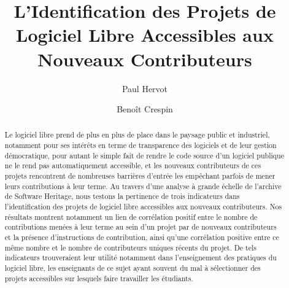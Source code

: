 \documentclass[dvipsnames]{llncs}
\title{L'Identification des Projets de Logiciel Libre Accessibles aux Nouveaux Contributeurs}
\author{%
    \todo[inline]{TODO: anonymiser les auteurs pour la soumission initiale}
    Paul Hervot\inst{1}%
    \and%
    Benoît Crespin\inst{2}\orcidID{0000-0002-9105-0243}%
}
\institute{EPITA}
\institute{EPITA \and Université de Limoge}
\begin{document}
    \maketitle

    \begin{abstract}
        Le logiciel libre prend de plus en plus de place dans le paysage public et industriel, notamment pour
        ses intérêts en terme de transparence des logiciels et de leur gestion démocratique, pour autant le
        simple fait de rendre le code source d'un logiciel publique ne le rend pas automatiquement accessible,
        et les nouveaux contributeurs de ces projets rencontrent de nombreuses barrières d'entrée les
        empêchant parfois de mener leurs contributions à leur terme. Au travers d'une analyse à grande échelle
        de l'archive de Software Heritage, nous testons la pertinence de trois indicateurs dans
        l'identification des projets de logiciel libre accessibles aux nouveaux contributeurs. Nos résultats
        montrent notamment un lien de corrélation positif entre le nombre de contributions menées à leur terme
        au sein d'un projet par de nouveaux contributeurs et la présence d'instructions de contribution, ainsi
        qu'une corrélation positive entre ce même nombre et le nombre de contributeurs uniques récents du
        projet. De tels indicateurs trouveraient leur utilité notamment dans l'enseignement des pratiques du
        logiciel libre, les enseignants de ce sujet ayant souvent du mal à sélectionner des projets
        accessibles sur lesquels faire travailler les étudiants.

    \end{abstract}
\end{document}
